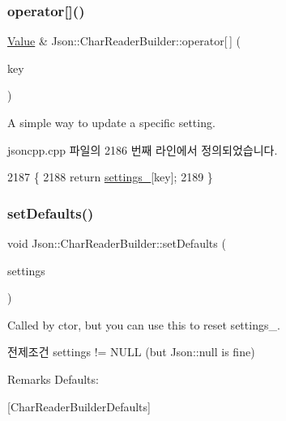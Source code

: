 \subsubsection{\texorpdfstring{operator[]()}{operator[]()}}
{\footnotesize\ttfamily \hyperlink{class_json_1_1_value}{Value} \& Json\+::\+Char\+Reader\+Builder\+::operator\mbox{[}$\,$\mbox{]} (\begin{DoxyParamCaption}\item[{\hyperlink{json_8h_a1e723f95759de062585bc4a8fd3fa4be}{J\+S\+O\+N\+C\+P\+P\+\_\+\+S\+T\+R\+I\+NG}}]{key }\end{DoxyParamCaption})}

A simple way to update a specific setting. 

jsoncpp.\+cpp 파일의 2186 번째 라인에서 정의되었습니다.


\begin{DoxyCode}
2187 \{
2188   \textcolor{keywordflow}{return} \hyperlink{class_json_1_1_char_reader_builder_ac69b7911ad64c171c51ebaf2ea26d958}{settings\_}[key];
2189 \}
\end{DoxyCode}
\mbox{\label{class_json_1_1_char_reader_builder_a03ff031e06aabff989ab4addc87294ab}} 
\subsubsection{\texorpdfstring{set\+Defaults()}{setDefaults()}}
{\footnotesize\ttfamily void Json\+::\+Char\+Reader\+Builder\+::set\+Defaults (\begin{DoxyParamCaption}\item[{\hyperlink{class_json_1_1_value}{Json\+::\+Value} $\ast$}]{settings }\end{DoxyParamCaption})\hspace{0.3cm}{\ttfamily [static]}}

Called by ctor, but you can use this to reset settings\+\_\+. \begin{DoxyPrecond}{전제조건}
\textquotesingle{}settings\textquotesingle{} != N\+U\+LL (but Json\+::null is fine) 
\end{DoxyPrecond}
\begin{DoxyRemark}{Remarks}
Defaults\+: 
\begin{DoxyCodeInclude}
\end{DoxyCodeInclude}

\end{DoxyRemark}
\mbox{[}Char\+Reader\+Builder\+Defaults\mbox{]}

